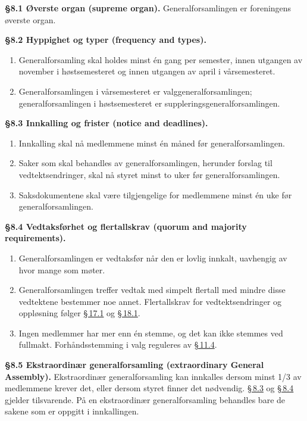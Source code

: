 \documentclass{../../../Common/Latex/Templates/rapport}
\begin{document}

\label{nbylaw:8}
\textbf{\S 8.1 Øverste organ (supreme organ).}\label{nbylaw:8.1} Generalforsamlingen er foreningens øverste organ.

\textbf{\S 8.2 Hyppighet og typer (frequency and types).}\label{nbylaw:8.2}
\begin{enumerate}
  \item Generalforsamling skal holdes minst \'en gang per semester, innen utgangen av november i høstsemesteret og innen utgangen av april i v\r{a}rsemesteret.
  \item Generalforsamlingen i v\r{a}rsemesteret er valggeneralforsamlingen; generalforsamlingen i høstsemesteret er suppleringsgeneralforsamlingen.
\end{enumerate}

\textbf{\S 8.3 Innkalling og frister (notice and deadlines).}\label{nbylaw:8.3}
\begin{enumerate}
  \item Innkalling skal n\r{a} medlemmene minst \'en m\r{a}ned før generalforsamlingen.
  \item Saker som skal behandles av generalforsamlingen, herunder forslag til vedtektsendringer, skal n\r{a} styret minst to uker før generalforsamlingen.
  \item Saksdokumentene skal være tilgjengelige for medlemmene minst \'en uke før generalforsamlingen.
\end{enumerate}

\textbf{\S 8.4 Vedtaksførhet og flertallskrav (quorum and majority requirements).}\label{nbylaw:8.4}
\begin{enumerate}
  \item Generalforsamlingen er vedtaksfør n\r{a}r den er lovlig innkalt, uavhengig av hvor mange som møter.
  \item Generalforsamlingen treffer vedtak med simpelt flertall med mindre disse vedtektene bestemmer noe annet. Flertallskrav for vedtektsendringer og oppløsning følger \hyperref[nbylaw:17.1]{\S\,17.1} og \hyperref[nbylaw:18.1]{\S\,18.1}.
  \item Ingen medlemmer har mer enn \'en stemme, og det kan ikke stemmes ved fullmakt. Forh\r{a}ndsstemming i valg reguleres av \hyperref[nbylaw:11.4]{\S\,11.4}.
\end{enumerate}

\textbf{\S 8.5 Ekstraordinær generalforsamling (extraordinary General Assembly).}\label{nbylaw:8.5} Ekstraordinær generalforsamling kan innkalles dersom minst 1/3 av medlemmene krever det, eller dersom styret finner det nødvendig. \hyperref[nbylaw:8.3]{\S\,8.3} og \hyperref[nbylaw:8.4]{\S\,8.4} gjelder tilsvarende. P\r{a} en ekstraordinær generalforsamling behandles bare de sakene som er oppgitt i innkallingen.
\end{document}
